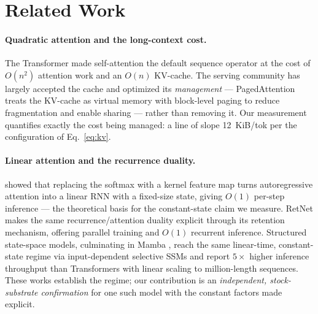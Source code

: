 \documentclass[11pt,a4paper]{article}
\newcommand{\ctx}{\ensuremath{n}}
\begin{document}
\section{Related Work}
\label{sec:related}

\paragraph{Quadratic attention and the long-context cost.}
The Transformer \citep{vaswani2017attention} made self-attention the default
sequence operator at the cost of \(O(\ctx^2)\) attention work and an \(O(\ctx)\)
KV-cache. The serving community has largely accepted the cache and optimized its
\emph{management} --- PagedAttention \citep{kwon2023vllm} treats the KV-cache as
virtual memory with block-level paging to reduce fragmentation and enable
sharing --- rather than removing it. Our measurement quantifies exactly the cost
being managed: a line of slope \SI{12}{KiB/tok} per the configuration of
Eq.~\eqref{eq:kv}.

\paragraph{Linear attention and the recurrence duality.}
\citet{katharopoulos2020transformers} showed that replacing the softmax with a
kernel feature map turns autoregressive attention into a linear RNN with a
fixed-size state, giving \(O(1)\) per-step inference --- the theoretical basis
for the constant-state claim we measure. RetNet \citep{sun2023retnet} makes the
same recurrence/attention duality explicit through its retention mechanism,
offering parallel training and \(O(1)\) recurrent inference. Structured
state-space models, culminating in Mamba \citep{gu2023mamba}, reach the same
linear-time, constant-state regime via input-dependent selective SSMs and report
\(5\times\) higher inference throughput than Transformers with linear scaling to
million-length sequences. These works establish the regime; our contribution is
an \emph{independent, stock-substrate confirmation} for one such model with the
constant factors made explicit.
\end{document}
